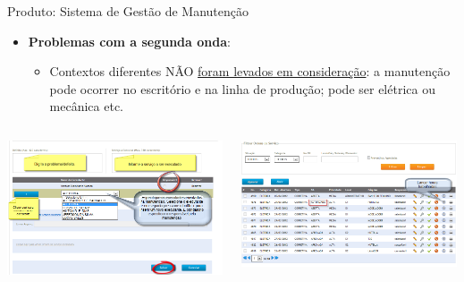 \begin{frame}{Produto: Sistema de Gestão de Manutenção}
	\begin{itemize}
		\item \textbf{Problemas com a segunda onda}:
		\begin{itemize}
			\item \alert{Contextos diferentes} NÃO \underline{foram levados em consideração}: a manutenção pode ocorrer no escritório e na linha de produção; pode ser elétrica ou mecânica etc. 
		\end{itemize}
	\end{itemize}
		
	\framebreak
	
	\begin{columns}
		\begin{column}{0.45\textwidth}
			\includegraphics[width=1\textwidth]{imagens/sgm-07}
		\end{column}
		\begin{column}{0.45\textwidth}
			\includegraphics[width=1\textwidth]{imagens/sgm-08}
		\end{column}
	\end{columns}
	

\end{frame}
